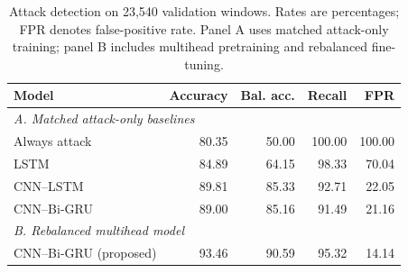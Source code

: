 \begin{table}[!t]
\centering
\caption{Attack detection on 23,540 validation windows. Rates are percentages; FPR denotes false-positive rate. Panel A uses matched attack-only training; panel B includes multihead pretraining and rebalanced fine-tuning.}
\label{tab:completed_comparison}
\setlength{\tabcolsep}{3pt}
\small
\begin{tabular}{lrrrr}
\toprule
Model & Accuracy & Bal. acc. & Recall & FPR \\
\midrule
\multicolumn{5}{l}{\textit{A. Matched attack-only baselines}} \\
Always attack & 80.35 & 50.00 & 100.00 & 100.00 \\
LSTM & 84.89 & 64.15 & 98.33 & 70.04 \\
CNN--LSTM & 89.81 & 85.33 & 92.71 & 22.05 \\
CNN--Bi-GRU & 89.00 & 85.16 & 91.49 & 21.16 \\
\midrule
\multicolumn{5}{l}{\textit{B. Rebalanced multihead model}} \\
CNN--Bi-GRU (proposed) & 93.46 & 90.59 & 95.32 & 14.14 \\
\bottomrule
\end{tabular}
\end{table}
